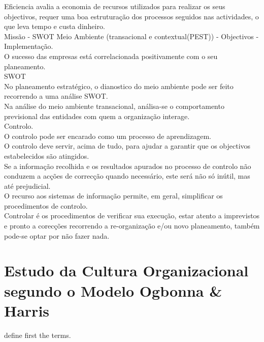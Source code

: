 Eficiencia avalia a economia de recursos utilizados para realizar os seus objectivos, requer uma boa estruturação dos processos seguidos nas actividades, o que leva tempo e custa dinheiro.\\

Missão - SWOT Meio Ambiente (transacional e contextual(PEST)) - Objectivos - Implementação.\\

O sucesso das empresas está correlacionada positivamente com o seu planeamento.\\

SWOT\\

No planeamento estratégico, o dianostico do meio ambiente pode ser feito recorrendo a uma análise SWOT.\\

Na análise do meio ambiente transacional, análisa-se o comportamento previsional das entidades com quem a organização interage.\\

Controlo.\\
O controlo pode ser encarado como um processo de aprendizagem.\\
O controlo deve servir, acima de tudo, para ajudar a garantir que os objectivos estabelecidos são atingidos.\\
Se a informação recolhida e os resultados apurados no processo de controlo não conduzem a acções de correcção quando necessário, este será não só inútil, mas até prejudicial.\\
O recurso aos sistemas de informação permite, em geral, simplificar os procedimentos de controlo.\\

Controlar é os procedimentos de verificar sua execução, estar atento a imprevistos e pronto a corecções recorrendo a re-organização e/ou novo planeamento, também pode-se optar por não fazer nada.\\




\section{Estudo da Cultura Organizacional segundo o Modelo Ogbonna \& Harris}


define first the terms.\\



